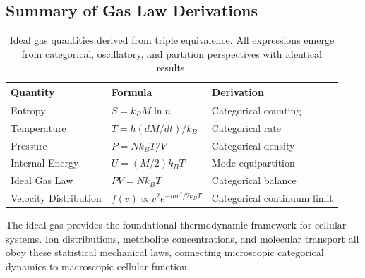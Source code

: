 \subsection{Summary of Gas Law Derivations}

\begin{table}[H]
\centering
\begin{tabular}{@{}lll@{}}
\toprule
\textbf{Quantity} & \textbf{Formula} & \textbf{Derivation} \\
\midrule
Entropy & $S = k_B M \ln n$ & Categorical counting \\
Temperature & $T = \hbar(dM/dt)/k_B$ & Categorical rate \\
Pressure & $P = Nk_BT/V$ & Categorical density \\
Internal Energy & $U = (M/2)k_BT$ & Mode equipartition \\
Ideal Gas Law & $PV = Nk_BT$ & Categorical balance \\
Velocity Distribution & $f(v) \propto v^2 e^{-mv^2/2k_BT}$ & Categorical continuum limit \\
\bottomrule
\end{tabular}
\caption{Ideal gas quantities derived from triple equivalence. All expressions emerge from categorical, oscillatory, and partition perspectives with identical results.}
\label{tab:gas_law_summary}
\end{table}

The ideal gas provides the foundational thermodynamic framework for cellular systems. Ion distributions, metabolite concentrations, and molecular transport all obey these statistical mechanical laws, connecting microscopic categorical dynamics to macroscopic cellular function.
